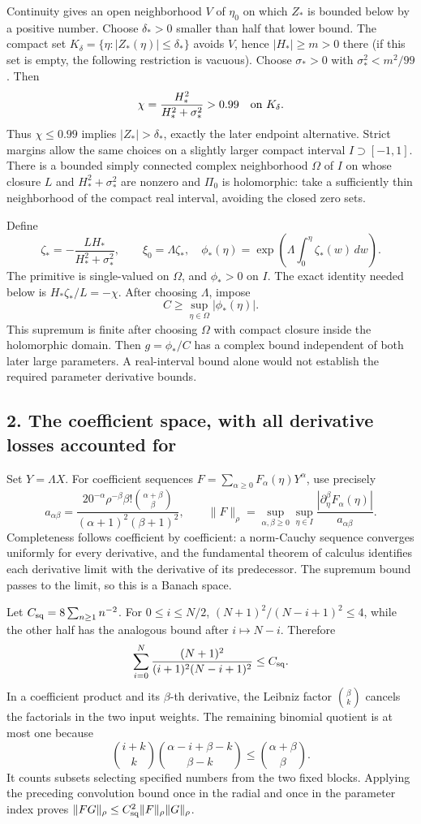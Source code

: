\documentclass[10pt,a4paper]{article}
\begin{document}
Continuity gives an open neighborhood \(V\) of \(\eta_0\) on which \(Z_*\) is bounded below by a positive number. Choose \(\delta_*>0\) smaller than half that lower bound. The compact set \(K_\delta=\{\eta:|Z_*(\eta)|\le\delta_*\}\) avoids \(V\), hence \(|H_*|\ge m>0\) there (if this set is empty, the following restriction is vacuous). Choose \(\sigma_*>0\) with \(\sigma_*^2<m^2/99\). Then
\[
\chi=\frac{H_*^2}{H_*^2+\sigma_*^2}>0.99\quad\hbox{on }K_\delta.
\]
Thus \(\chi\le0.99\) implies \(|Z_*|>\delta_*\), exactly the later endpoint alternative. Strict margins allow the same choices on a slightly larger compact interval \(I\supset[-1,1]\). There is a bounded simply connected complex neighborhood \(\Omega\) of \(I\) on whose closure \(L\) and \(H_*^2+\sigma_*^2\) are nonzero and \(\Pi_0\) is holomorphic: take a sufficiently thin neighborhood of the compact real interval, avoiding the closed zero sets.

Define
\[
\zeta_*=-\frac{LH_*}{H_*^2+\sigma_*^2},\qquad \xi_0=\Lambda\zeta_*,
\quad\phi_*(\eta)=\exp\left(\Lambda\int_0^\eta\zeta_*(w)\,dw\right).
\]
The primitive is single-valued on \(\Omega\), and \(\phi_*>0\) on \(I\). The exact identity needed below is \(H_*\zeta_*/L=-\chi\). After choosing \(\Lambda\), impose
\[
C\ge\sup_{\eta\in\Omega}|\phi_*(\eta)|.
\]
This supremum is finite after choosing \(\Omega\) with compact closure inside the holomorphic domain. Then \(g=\phi_*/C\) has a complex bound independent of both later large parameters. A real-interval bound alone would not establish the required parameter derivative bounds.

\subsection{2. The coefficient space, with all derivative losses accounted for}

Set \(Y=\Lambda X\). For coefficient sequences \(F=\sum_{\alpha\ge0}F_\alpha(\eta)Y^\alpha\), use precisely
\[
a_{\alpha\beta}=
\frac{20^{-\alpha}\rho^{-\beta}\beta!\binom{\alpha+\beta}{\beta}}
{(\alpha+1)^2(\beta+1)^2},
\qquad
\|F\|_\rho=\sup_{\alpha,\beta\ge0}\sup_{\eta\in I}
\frac{|\partial_\eta^\beta F_\alpha(\eta)|}{a_{\alpha\beta}}.
\]
Completeness follows coefficient by coefficient: a norm-Cauchy sequence converges uniformly for every derivative, and the fundamental theorem of calculus identifies each derivative limit with the derivative of its predecessor. The supremum bound passes to the limit, so this is a Banach space.

Let \(C_{\rm sq}=8\sum_{n\ge1}n^{-2}\). For \(0\le i\le N/2\), \((N+1)^2/(N-i+1)^2\le4\), while the other half has the analogous bound after \(i\mapsto N-i\). Therefore
\[
\sum_{i=0}^N\frac{(N+1)^2}{(i+1)^2(N-i+1)^2}\le C_{\rm sq}.
\]
In a coefficient product and its \(\beta\)-th derivative, the Leibniz factor \(\binom\beta k\) cancels the factorials in the two input weights. The remaining binomial quotient is at most one because
\[
\binom{i+k}{k}\binom{\alpha-i+\beta-k}{\beta-k}
\le\binom{\alpha+\beta}{\beta}.
\]
It counts subsets selecting specified numbers from the two fixed blocks. Applying the preceding convolution bound once in the radial and once in the parameter index proves
\(\|FG\|_\rho\le C_{\rm sq}^2\|F\|_\rho\|G\|_\rho\).
\end{document}
